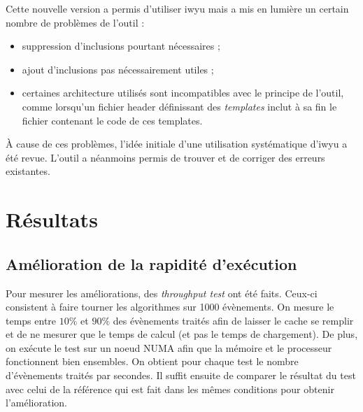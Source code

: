 \documentclass[a4paper,11pt]{report}
\begin{document}
Cette nouvelle version a permis d'utiliser iwyu mais a mis en lumière un certain nombre de problèmes de l'outil :
\begin{itemize}
    \item suppression d'inclusions pourtant nécessaires ;
    \item ajout d'inclusions pas nécessairement utiles ;
    \item certaines architecture utilisés sont incompatibles avec le principe de l'outil, comme lorsqu'un fichier header définissant des \emph{templates} inclut à sa fin le fichier contenant le code de ces templates.
\end{itemize}

À cause de ces problèmes, l'idée initiale d'une utilisation systématique d'iwyu a été revue.
L'outil a néanmoins permis de trouver et de corriger des erreurs existantes.


\chapter{Résultats}

\section{Amélioration de la rapidité d'exécution}
Pour mesurer les améliorations, des \emph{throughput test} ont été faits.
Ceux-ci consistent à faire tourner les algorithmes sur 1000 évènements.
On mesure le temps entre $10\%$ et $90\%$ des évènements traités afin de laisser le cache se remplir et de ne mesurer que le temps de calcul (et pas le temps de chargement).
De plus, on exécute le test sur un noeud NUMA afin que la mémoire et le processeur fonctionnent bien ensembles.
On obtient pour chaque test le nombre d'évènements traités par secondes.
Il suffit ensuite de comparer le résultat du test avec celui de la référence qui est fait dans les mêmes conditions pour obtenir l'amélioration.
\end{document}
